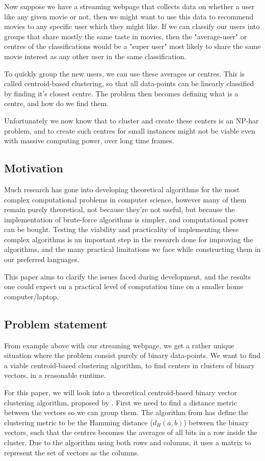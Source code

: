 \documentclass[a4paper]{article}
\begin{document}
Now suppose we have a streaming webpage that collects data on whether a user like any given movie or not,
then we might want to use this data to recommend movies to any specific user which they might like.
If we can classify our users into groups that share mostly the same taste in movies, then
the "average-user" or centres of the classifications would be a "super user" most likely to share the same movie
interest as any other user in the same classification.

To quickly group the new users, we can use these averages or centres. This is called centroid-based
clustering, so that all data-points can be linearly classified by finding it's closest centre.
The problem then becomes defining what is a centre, and how do we find them.

Unfortunately we now know that to cluster and create these centers is an NP-har problem, 
and to create such centres for small instances might not be viable even with massive computing power,
over long time frames.

\subsection{Motivation}
Much research has gone into developing theoretical algorithms for the most complex computational
problems in computer science, however many of them remain purely theoretical, not because
they're not useful, but because the implementation of brute-force algorithms is simpler, and
computational power can be bought. Testing the viability and practicality of implementing
these complex algorithms is an important step in the research done for improving the
algorithms, and the many practical limitations we face while constructing them in our
preferred languages.

This paper aims to clarify the issues faced during development, and the results one could expect
on a practical level of computation time on a smaller home computer/laptop.

\subsection{Problem statement}
From example above with our streaming webpage, we get a rather unique situation where the problem consist 
purely of binary data-points. We want to find a viable centroid-based clustering algorithm, to find
centers in clusters of binary vectors, in a reasonable runtime.

For this paper, we will look into a theoretical centroid-based binary vector clustering algorithm, proposed
by \cite{fomin_golovach_panolan_2020}. First we need to find a distance metric between the vectors so we 
can group them. The algorithm from \cite{fomin_golovach_panolan_2020} has define the clustering metric 
to be the Hamming distance (\textit{$d_H(a, b)$}) between the binary vectors, such that the centres 
becomes the averages of all bits in a row inside the cluster. Due to the algorithm using both rows and 
columns, it uses a matrix to represent the set of vectors as the columns.
\end{document}
